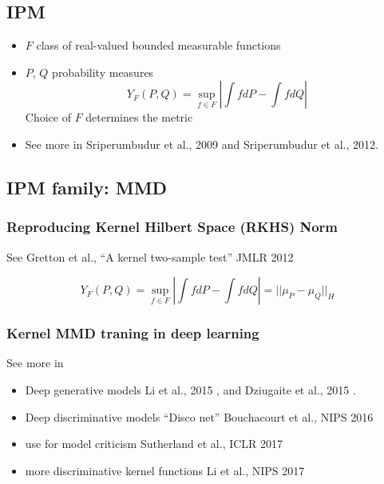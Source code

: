 \subsection{IPM}

\begin{itemize}
  \item $F$ class of real-valued bounded measurable functions
  \item $P$, $Q$ probability measures
    \begin{equation}
      Y_F(P,Q) = \sup_{f \in F} \left| \int fdP - \int fdQ \right|
    \end{equation}
  Choice of $F$ determines the metric
\item See more in Sriperumbudur et al., 2009 and Sriperumbudur et al., 2012.
\end{itemize}

\subsection{IPM family: MMD}


\subsubsection{Reproducing Kernel Hilbert Space (RKHS) Norm}

See Gretton et al., ``A kernel two-sample test'' JMLR 2012
\cite{gretton2012kernel}


\begin{equation}
  Y_F(P,Q) = \sup_{f \in F} \left| \int fdP - \int fdQ \right| = || \mu_P -
  \mu_Q ||_H
\end{equation}

\subsubsection{Kernel MMD traning in deep learning}

See more in

\begin{itemize}
  \item Deep generative models Li et al., 2015 \cite{li2015generative}, and
    Dziugaite et al., 2015 \cite{dziugaite2015training}.
  \item Deep discriminative models ``Disco net'' Bouchacourt et al., NIPS 2016
    \cite{bouchacourt2016disco}
  \item use for model criticism Sutherland et al., ICLR 2017 \cite{sutherland2017soumyajit}
  \item more discriminative kernel functions Li et al., NIPS 2017
    \cite{li2017mmd}
\end{itemize}


